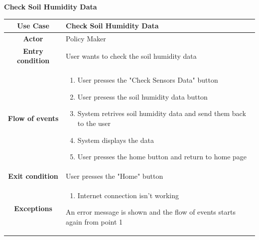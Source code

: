 \documentclass[table, 12pt]{article}
\begin{document}
\begin{itemize}
            \begin{table}[H]
                \item[] \textbf{Check Soil Humidity Data}
                \item[] 
                \centering
                \begin{tabular}{|c| m{}|}
                    \hline
                    \textbf{Use Case} & Check Soil Humidity Data\\ \hline
                    \textbf{Actor} & Policy Maker \\ \hline
                    \textbf{Entry condition} & User wants to check the soil humidity data\\  \hline
                    \textbf{Flow of events} & \begin{enumerate}
                                                \item User presses the "Check Sensors Data" button
                                                \item User presess the soil humidity data button
                                                \item System retrives soil humidity data and send them back to the user
                                                \item System displays the data
                                                \item User presses the home button and return to home page
                                            \end{enumerate}\\ \hline
                    \textbf{Exit condition} & User presses the "Home" button\\ \hline
                    \textbf{Exceptions} &  \begin{enumerate}
                        \item Internet connection isn't working
                    \end{enumerate}
                    An error message is shown and the flow of events starts again from point 1\\ \hline                   
                \end{tabular}
            \end{table}


\end{itemize}
\end{document}
